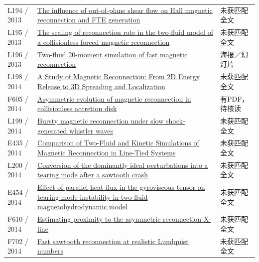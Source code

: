 \documentclass[UTF8,a4paper,11pt,openany,fontset=fandol]{ctexbook}
\begin{document}
\begin{longtable}{P{24mm}P{97mm}P{27mm}}
L194 / 2013 & \href{https://doi.org/10.1002/jgra.50417}{The influence of out‐of‐plane shear flow on Hall magnetic reconnection and FTE generation} & 未获匹配全文\\

L195 / 2013 & \href{https://doi.org/10.1017/s0022377812001201}{The scaling of reconnection rate in the two-fluid model of a collisionless forced magnetic reconnection} & 未获匹配全文\\

L196 / 2013 & \href{https://lirias.kuleuven.be/handle/123456789/463177}{Two-fluid 20-moment simulation of fast magnetic reconnection} & 海报／幻灯片\\

L198 / 2014 & \href{https://doi.org/10.33915/etd.6627}{A Study of Magnetic Reconnection: From 2D Energy Release to 3D Spreading and Localization} & 未获匹配全文\\

F605 / 2014 & \href{https://doi.org/10.1063/1.4875739}{Asymmetric evolution of magnetic reconnection in collisionless accretion disk} & 有PDF，待核读\\

L199 / 2014 & \href{https://doi.org/10.1002/2014ja020190}{Bursty magnetic reconnection under slow shock‐generated whistler waves} & 未获匹配全文\\

E435 / 2014 & \href{https://agu.confex.com/agu/fm14/webprogram/Paper27518.html}{Comparison of Two-Fluid and Kinetic Simulations of Magnetic Reconnection in Line-Tied Systems} & 未获匹配全文\\

L200 / 2014 & \href{https://doi.org/10.1063/1.4902106}{Conversion of the dominantly ideal perturbations into a tearing mode after a sawtooth crash} & 未获匹配全文\\

E454 / 2014 & \href{http://absimage.aps.org/image/DPP14/MWS_DPP14-2014-000895.pdf}{Effect of parallel heat flux in the gyroviscous tensor on tearing mode instability in two-fluid magnetohydrodynamic model} & 未获匹配全文\\

F610 / 2014 & \href{https://scholars.unh.edu/dissertation/2170}{Estimating proximity to the asymmetric reconnection X-line} & 未获匹配全文\\

F702 / 2014 & \href{https://doi.org/10.1088/0741-3335/57/1/014017}{Fast sawtooth reconnection at realistic Lundquist numbers} & 未获匹配全文\\


\end{longtable}
\end{document}
